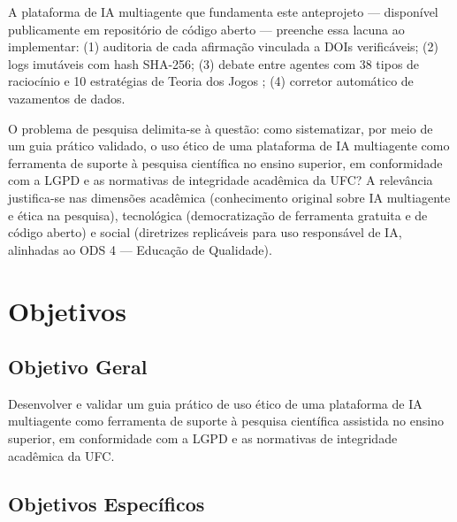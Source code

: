\documentclass[
    12pt,
    openany,
    oneside,
    a4paper,
    brazilian
]{abntex2}
\begin{document}
A plataforma de IA multiagente que fundamenta este anteprojeto --- disponível publicamente em repositório de código aberto --- preenche essa lacuna ao implementar: (1) auditoria de cada afirmação vinculada a DOIs verificáveis; (2) logs imutáveis com hash SHA-256; (3) debate entre agentes com 38 tipos de raciocínio e 10 estratégias de Teoria dos Jogos \cite{nash1950}; (4) corretor automático de vazamentos de dados.

O problema de pesquisa delimita-se à questão: como sistematizar, por meio de um guia prático validado, o uso ético de uma plataforma de IA multiagente como ferramenta de suporte à pesquisa científica no ensino superior, em conformidade com a LGPD e as normativas de integridade acadêmica da UFC? A relevância justifica-se nas dimensões acadêmica (conhecimento original sobre IA multiagente e ética na pesquisa), tecnológica (democratização de ferramenta gratuita e de código aberto) e social (diretrizes replicáveis para uso responsável de IA, alinhadas ao ODS 4 --- Educação de Qualidade).

\section{Objetivos}

\subsection{Objetivo Geral}

Desenvolver e validar um guia prático de uso ético de uma plataforma de IA multiagente como ferramenta de suporte à pesquisa científica assistida no ensino superior, em conformidade com a LGPD e as normativas de integridade acadêmica da UFC.

\subsection{Objetivos Específicos}
\end{document}
